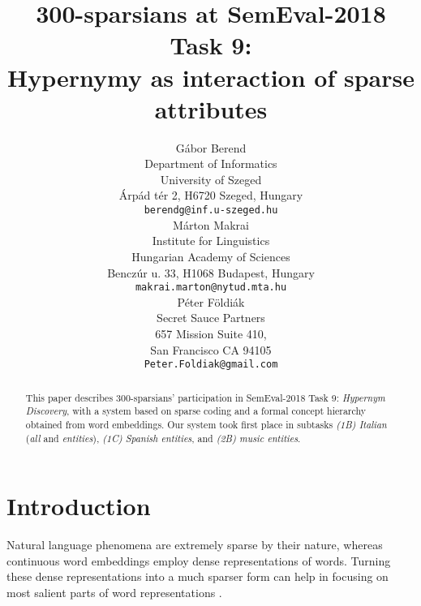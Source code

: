 \documentclass[11pt,a4paper]{article}
\title{300-sparsians at SemEval-2018 Task 9: \\
Hypernymy as interaction of sparse attributes}
\author{Gábor Berend \\
Department of Informatics \\ University of Szeged \\
Árpád tér 2, H6720 Szeged, Hungary \\
{\tt berendg@inf.u-szeged.hu} \\\And
  Márton Makrai  \\
  Institute for Linguistics \\
  Hungarian Academy of Sciences \\
  Benczúr u. 33, H1068 Budapest, Hungary \\
  {\tt makrai.marton@nytud.mta.hu} \\\AND
  Péter Földiák \\
  Secret Sauce Partners \\
  657 Mission Suite 410, \\
  San Francisco CA 94105 \\
  {\tt Peter.Foldiak@gmail.com} \\}
\date{}
\begin{document}
\maketitle

\begin{abstract}
  This paper describes 300-sparsians’ participation in SemEval-2018 Task 9:
  \emph{Hypernym Discovery}, with a system based on sparse coding and a formal
  concept hierarchy obtained from word embeddings.
  Our system took first place in subtasks
  \emph{(1B) Italian} (\emph{all} and \emph{entities}),
  \emph{(1C) Spanish entities}, and
  \emph{(2B) music entities}.
\end{abstract}


\section{Introduction}

Natural language phenomena are extremely sparse by their nature,
whereas continuous word embeddings employ dense representations of words.
Turning these dense representations into a much sparser form can help in
focusing on most salient parts of word representations
\citep{Faruqui:2015,Berend:2017,Subramanian:2018}.

\end{document}
